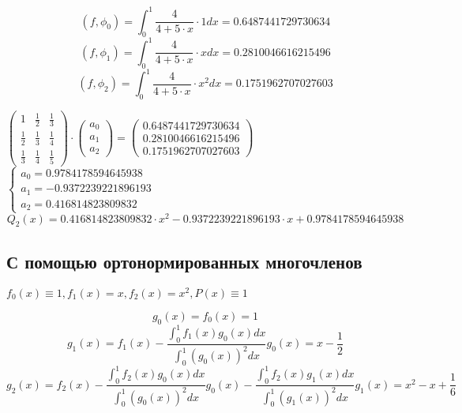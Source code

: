 \begin{displaymath}
(f, \phi_0) = \int_0^1 \frac{4}{4 + 5 \cdot x} \cdot 1 dx = 0.6487441729730634
\end{displaymath}
\begin{displaymath}
(f, \phi_1) = \int_0^1 \frac{4}{4 + 5 \cdot x} \cdot x dx = 0.2810046616215496
\end{displaymath}
\begin{displaymath}
(f, \phi_2) = \int_0^1 \frac{4}{4 + 5 \cdot x} \cdot x^2 dx = 0.1751962707027603
\end{displaymath}

$
\begin{pmatrix}
1 & \frac{1}{2} & \frac{1}{3}
\\
\frac{1}{2} & \frac{1}{3} & \frac{1}{4}
\\
\frac{1}{3} & \frac{1}{4} & \frac{1}{5}
\end{pmatrix}
\cdot
\begin{pmatrix}
a_0
\\
a_1
\\
a_2
\end{pmatrix}
=
\begin{pmatrix}
0.6487441729730634
\\
0.2810046616215496
\\
0.1751962707027603
\end{pmatrix}
$\\[1mm]

$
 \begin{cases}
  a_0 = 0.9784178594645938
\\
  a_1 = -0.9372239221896193
\\
  a_2 = 0.416814823809832
 \end{cases}
$\\[1mm]

\begin{displaymath}
Q_2(x) = 0.416814823809832 \cdot x^2 - 0.9372239221896193 \cdot x + 0.9784178594645938
\end{displaymath}

\subsection{С помощью ортонормированных многочленов}

$f_0(x) \equiv 1, f_1(x) = x, f_2(x) = x^2, P(x) \equiv 1$

\begin{displaymath}
g_0(x) = f_0(x) = 1
\end{displaymath}
\begin{displaymath}
g_1(x) = f_1(x) - \frac{\int_0^1 f_1(x) g_0(x)dx}{\int_0^1 (g_0(x))^2dx}g_0(x) = x - \frac{1}{2}
\end{displaymath}
\begin{displaymath}
g_2(x) = f_2(x) - \frac{\int_0^1 f_2(x) g_0(x)dx}{\int_0^1 (g_0(x))^2dx}g_0(x) - \frac{\int_0^1 f_2(x) g_1(x)dx}{\int_0^1 (g_1(x))^2dx}g_1(x) = x^2 - x + \frac{1}{6}
\end{displaymath}


